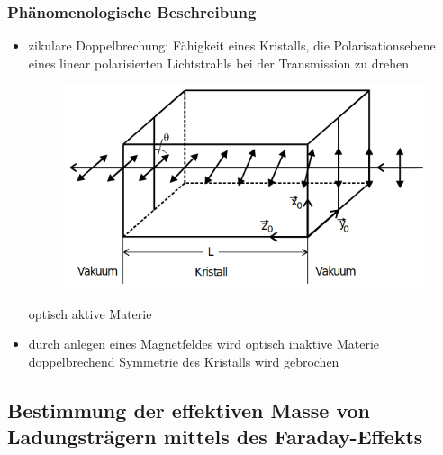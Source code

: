 \subsubsection*{Phänomenologische Beschreibung}
\begin{itemize}
    \item zikulare Doppelbrechung:
        Fähigkeit eines Kristalls, die Polarisationsebene eines linear polarisierten Lichtstrahls bei der Transmission zu drehen
        \begin{figure}[H]
            \centering
            \includegraphics[scale=0.5]{pictures/Doppelbrechung.png}
            \caption{\cite{Anhang}}
        \end{figure}
        \to optisch aktive Materie
    \item durch anlegen eines Magnetfeldes wird optisch inaktive Materie doppelbrechend
        \to Symmetrie des Kristalls wird gebrochen
\end{itemize}

\subsection{Bestimmung der effektiven Masse von Ladungsträgern mittels des Faraday-Effekts}
